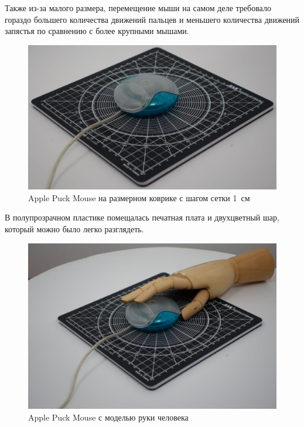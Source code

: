 \documentclass[11pt, a4paper]{article}
\begin{document}
Также из-за малого размера, перемещение мыши на самом деле требовало гораздо большего количества движений  пальцев и  меньшего количества движений запястья по сравнению с более крупными мышами.

\begin{figure}[h]
    \centering
    \includegraphics[scale=0.3]{1998_apple_puck/appleset.jpg}
    \caption{Apple Puck Mouse на размерном коврике с шагом сетки 1~см}
    \label{fig:size}
\end{figure}

В полупрозрачном пластике помещалась печатная плата и двухцветный шар, который можно было легко разглядеть. 
\begin{figure}[h]
    \centering
    \includegraphics[scale=0.25]{1998_apple_puck/appleset2.jpg}
    \caption{Apple Puck Mouse с моделью руки человека}
    \label{fig:hand}
\end{figure}
\end{document}
